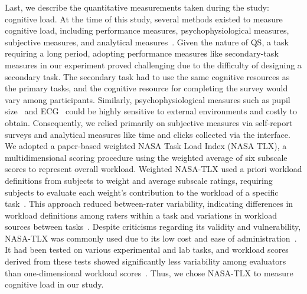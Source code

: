 
Last, we describe the quantitative measurements taken during the study: cognitive load. At the time of this study, several methods existed to measure cognitive load, including performance measures, psychophysiological measures, subjective measures, and analytical measures~\cite{gaoMentalWorkloadMeasurement2013}. Given the nature of QS, a task requiring a long period, adopting performance measures like secondary-task measures in our experiment proved challenging due to the difficulty of designing a secondary task. The secondary task had to use the same cognitive resources as the primary tasks, and the cognitive resource for completing the survey would vary among participants. Similarly, psychophysiological measures such as pupil size~\cite{palinkoEstimatingCognitiveLoad2010} and ECG~\cite{haapalainenPsychophysiologicalMeasuresAssessing2010} could be highly sensitive to external environments and costly to obtain. Consequently, we relied primarily on subjective measures via self-report surveys and analytical measures like time and clicks collected via the interface. We adopted a paper-based weighted NASA Task Load Index (NASA TLX), a multidimensional scoring procedure using the weighted average of six subscale scores to represent overall workload. Weighted NASA-TLX used a priori workload definitions from subjects to weight and average subscale ratings, requiring subjects to evaluate each weight's contribution to the workload of a specific task~\cite{hart1988development, hartNasaTaskLoadIndex2006, cain2007review}. This approach reduced between-rater variability, indicating differences in workload definitions among raters within a task and variations in workload sources between tasks~\cite{cain2007review}. Despite criticisms regarding its validity and vulnerability, NASA-TLX was commonly used due to its low cost and ease of administration~\cite{gaoMentalWorkloadMeasurement2013}. It had been tested on various experimental and lab tasks, and workload scores derived from these tests showed significantly less variability among evaluators than one-dimensional workload scores~\cite{rubioEvaluationSubjectiveMental2004}. Thus, we chose NASA-TLX to measure cognitive load in our study.

